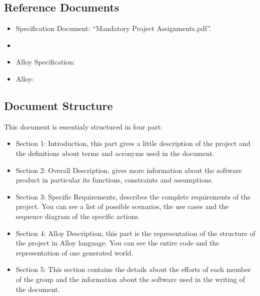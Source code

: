 \subsection{Reference Documents}
\begin{itemize}
\renewcommand{\labelitemi}{$-$}
\item
Specification Document: “Mandatory Project Assignments.pdf”.
\item
\href{http://ieeexplore.ieee.org/servlet/opac?punumber=6146377}{\color{Black}{IEEE Std 29148-2011 - ISO/IEC/IEEE International Standard - Systems and software engineering.}}
\item
Alloy Specification:\href{http://alloy.mit.edu/alloy/}{\color{Black}{"Software Abstractation", Daniel Jackson.}}
\item
Alloy:\href{http://tmancini.di.uniroma1.it/teaching/courses/2007-2008/mfis/materiale/progetti/Pagliaro\%20-\%20Alloy.relazione.pdf}{\color{Black}{"Alloy e l'Analyzer versione 4.0", "Alessandro Pagliaro"}}

\end{itemize}

\subsection{Document Structure}
This document is essentialy structured in four part:
\begin{itemize}
\item
Section 1: Introduction, this part gives a little description of the project and the definitions about terms and acronyms used in the document.
\item
Section 2: Overall Description, gives more information about the software product in particular its functions, constraints and assumptions.
\item
Section 3: Specific Requirements, describes the complete requirements of the project. You can see a list of possible scenarios, the use cases and the sequence diagram of the specific actions.
\item
Section 4: Alloy Description, this part is the representation of the structure of the project in Alloy language. You can see the entire code and the representation of one generated world.
\item
Section 5: This section contains the details about the efforts of each member of the group and the information about the software used in the writing of the document.
\end{itemize}